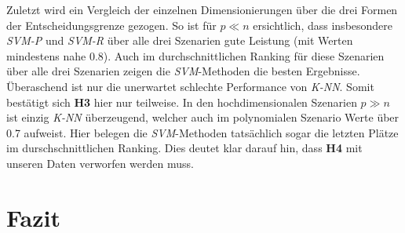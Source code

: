 \documentclass[
]{article}
\begin{document}
Zuletzt wird ein Vergleich der einzelnen Dimensionierungen über die drei
Formen der Entscheidungsgrenze gezogen. So ist für \(p \ll n\)
ersichtlich, dass insbesondere \textit{SVM-P} und \textit{SVM-R} über
alle drei Szenarien gute Leistung (mit Werten mindestens nahe 0.8). Auch
im durchschnittlichen Ranking für diese Szenarien über alle drei
Szenarien zeigen die \textit{SVM}-Methoden die besten Ergebnisse.
Überaschend ist nur die unerwartet schlechte Performance von
\textit{K-NN}. Somit bestätigt sich \textbf{H3} hier nur teilweise. In
den hochdimensionalen Szenarien \(p \gg n\) ist einzig \textit{K-NN}
überzeugend, welcher auch im polynomialen Szenario Werte über 0.7
aufweist. Hier belegen die \textit{SVM}-Methoden tatsächlich sogar die
letzten Plätze im durschschnittlichen Ranking. Dies deutet klar darauf
hin, dass \textbf{H4} mit unseren Daten verworfen werden muss.

\section{Fazit}
\end{document}
